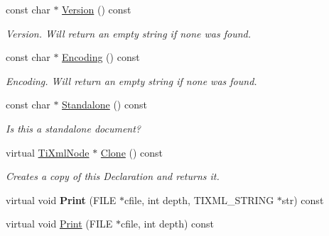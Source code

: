 \begin{DoxyCompactItemize}
\hypertarget{class_ti_xml_declaration_a95cdcb9354ea220065bd378ffcacc7bd}{}\label{class_ti_xml_declaration_a95cdcb9354ea220065bd378ffcacc7bd} 
const char $\ast$ \hyperlink{class_ti_xml_declaration_a95cdcb9354ea220065bd378ffcacc7bd}{Version} () const
\begin{DoxyCompactList}\small\item\em Version. Will return an empty string if none was found. \end{DoxyCompactList}\item 
\hypertarget{class_ti_xml_declaration_a8d3d1b5b226daa8353276d719497be80}{}\label{class_ti_xml_declaration_a8d3d1b5b226daa8353276d719497be80} 
const char $\ast$ \hyperlink{class_ti_xml_declaration_a8d3d1b5b226daa8353276d719497be80}{Encoding} () const
\begin{DoxyCompactList}\small\item\em Encoding. Will return an empty string if none was found. \end{DoxyCompactList}\item 
\hypertarget{class_ti_xml_declaration_a1f2f8a741593d15a61e491e5024cacef}{}\label{class_ti_xml_declaration_a1f2f8a741593d15a61e491e5024cacef} 
const char $\ast$ \hyperlink{class_ti_xml_declaration_a1f2f8a741593d15a61e491e5024cacef}{Standalone} () const
\begin{DoxyCompactList}\small\item\em Is this a standalone document? \end{DoxyCompactList}\item 
\hypertarget{class_ti_xml_declaration_a35dc1455f69b79e81cae28e186944610}{}\label{class_ti_xml_declaration_a35dc1455f69b79e81cae28e186944610} 
virtual \hyperlink{class_ti_xml_node}{Ti\+Xml\+Node} $\ast$ \hyperlink{class_ti_xml_declaration_a35dc1455f69b79e81cae28e186944610}{Clone} () const
\begin{DoxyCompactList}\small\item\em Creates a copy of this Declaration and returns it. \end{DoxyCompactList}\item 
\hypertarget{class_ti_xml_declaration_ace687d02a5a25a060ae3802abb1b3f55}{}\label{class_ti_xml_declaration_ace687d02a5a25a060ae3802abb1b3f55} 
virtual void {\bfseries Print} (F\+I\+LE $\ast$cfile, int depth, T\+I\+X\+M\+L\+\_\+\+S\+T\+R\+I\+NG $\ast$str) const
\item 
virtual void \hyperlink{class_ti_xml_declaration_ae46cff6565f299210ab945e78bf28514}{Print} (F\+I\+LE $\ast$cfile, int depth) const
\item 

\end{DoxyCompactItemize}
